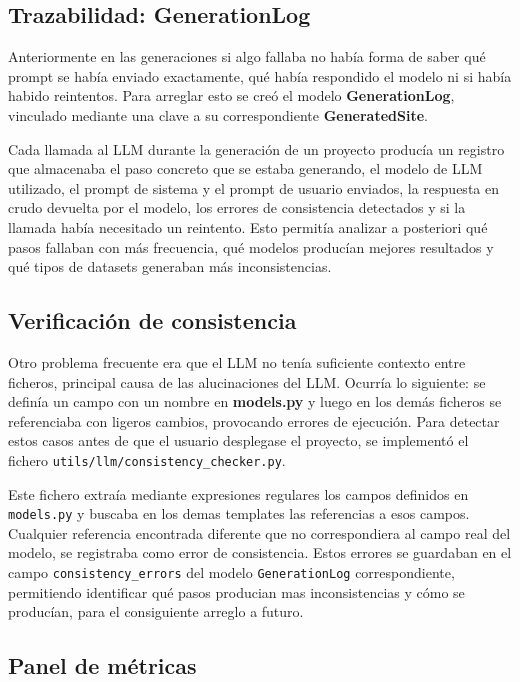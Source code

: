 \subsection{Trazabilidad: GenerationLog}
\label{subsec:trazabilidad-generationlog}

Anteriormente en las generaciones si algo fallaba no había forma de saber qué prompt se había enviado exactamente, qué había respondido el modelo ni si había habido reintentos. Para arreglar esto se creó el modelo \textbf{GenerationLog}, vinculado mediante una clave a su correspondiente \textbf{GeneratedSite}. 

Cada llamada al LLM durante la generación de un proyecto producía un registro que almacenaba el paso concreto que se estaba generando, el modelo de LLM utilizado, el prompt de sistema y el prompt de usuario enviados, la respuesta en crudo devuelta por el modelo, los errores de consistencia detectados y si la llamada había necesitado un reintento. Esto permitía analizar a posteriori qué pasos fallaban con más frecuencia, qué modelos producían mejores resultados y qué tipos de datasets generaban más inconsistencias.


\subsection{Verificación de consistencia}
\label{subsec:verificacion-consistencia}

Otro problema frecuente era que el LLM no tenía suficiente contexto entre ficheros, principal causa de las alucinaciones del LLM. Ocurría lo siguiente:
se definía un campo con un nombre en \textbf{models.py} y luego en los demás ficheros se referenciaba con ligeros cambios, provocando errores de ejecución.
Para detectar estos casos antes de que el usuario desplegase el proyecto, se implementó el fichero \texttt{utils/llm/consistency\_checker.py}.

Este fichero extraía mediante expresiones regulares los campos definidos en \texttt{models.py} y buscaba en los demas templates las referencias a esos campos. Cualquier referencia encontrada diferente que no correspondiera al campo real del modelo, se registraba como error de consistencia. 
Estos errores se guardaban en el campo \texttt{consistency\_errors} del modelo \texttt{GenerationLog} correspondiente, permitiendo identificar qué pasos producian mas inconsistencias y cómo se producían, para el consiguiente arreglo a futuro.


\subsection{Panel de métricas}
\label{subsec:panel-metricas}

